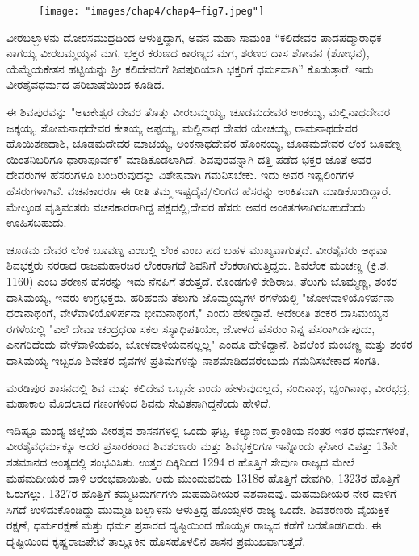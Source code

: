 \begin{figure}[!h]
\texttt{[image: "images/chap4/chap4–fig7.jpeg"]}
\end{figure}

ವೀರಬಲ್ಲಾಳನು ದೋರಸಮುದ್ರದಿಂದ ಆಳುತ್ತಿದ್ದಾಗ, ಅವನ ಮಹಾ ಸಾಮಂತ “ಕಲಿದೇವರ ಪಾದಪದ್ಮಾರಾಧಕ ನಾಗಯ್ಯ ವೀರಬಮ್ಮಯ್ಯನ ಮಗ, ಭಕ್ತರ ಕರುಣದ ಕಾರಣ್ಯದ ಮಗ, ಶರಣರ ದಾಸ ಶೋವನ (ಶೋಭನ), ಯೆಮ್ಮೆಯಕೇತನ ಹಟ್ಟಿಯನ್ನು ಶ‍್ರೀ ಕಲಿದೇವರಿಗೆ ಶಿವಪುರಿಯಾಗಿ ಭಕ್ತರಿಗೆ ಧರ್ಮವಾಗಿ” ಕೊಡುತ್ತಾರೆ. ಇದು ವೀರಶೈವಧರ್ಮದ ಪರಿಭಾಷೆಯಿಂದ ಕೂಡಿದೆ.

ಈ ಶಿವಪುರವನ್ನು "ಅಟಕೇಶ್ವರ ದೇವರ ತೊತ್ತು ವೀರಬಮ್ಮಯ್ಯ, ಚೂಡಮದೇವರ ಅಂಕಯ್ಯ, ಮಲ್ಲಿನಾಥದೇವರ ಜಕ್ಕಯ್ಯ, ಸೋಮನಾಥದೇವರ ಕೇತಯ್ಯ ಅಪ್ಪಯ್ಯ, ಮಲ್ಲಿನಾಥ ದೇವರ ಯೇಚಯ್ಯ, ರಾಮನಾಥದೇವರ ಹೊಯಿಶಣದಾಶಿ, ಚೂಡಮದೇವರ ಮಾಚಯ್ಯ, ಅಂಕನಾಥದೇವರ ಹೊಂನಯ್ಯ, ಚೂಡಮದೇವರ ಲೆಂಕ ಬೂವಣ್ನ ಯಿಂತನಿಬರಿಗೂ ಧಾರಾಪೂರ್ವಕ" ಮಾಡಿಕೊಡಲಾಗಿದೆ. ಶಿವಪುರವನ್ನಾಗಿ ದತ್ತಿ ಪಡೆದ ಭಕ್ತರ ಜೊತೆ ಅವರ ದೇವರುಗಳ ಹೆಸರುಗಳೂ ಬಂದಿರುವುದನ್ನು ವಿಶೇಷವಾಗಿ ಗಮನಿಸಬೇಕು. ಇದು ಅವರ ಇಷ್ಟಲಿಂಗಗಳ ಹೆಸರುಗಳಾಗಿವೆ. ವಚನಕಾರರೂ ಈ ರೀತಿ ತಮ್ಮ ಇಷ್ಟದೈವ/ಲಿಂಗದ ಹೆಸರನ್ನು ಅಂಕಿತವಾಗಿ ಮಾಡಿಕೊಂಡಿದ್ದಾರೆ. ಮೇಲ್ಕಂಡ ವೃತ್ತಿವಂತರು ವಚನಕಾರರಾಗಿದ್ದ ಪಕ್ಷದಲ್ಲಿ,ದೇವರ ಹೆಸರು ಅವರ ಅಂಕಿತಗಳಾಗಿರಬಹುದೆಂದು ಊಹಿಸಬಹುದು.

ಚೂಡಮ ದೇವರ ಲೆಂಕ ಬೂವಣ್ನ ಎಂಬಲ್ಲಿ ಲೆಂಕ ಎಂಬ ಪದ ಬಹಳ ಮುಖ್ಯವಾಗುತ್ತದೆ. ವೀರಶೈವರು ಅಥವಾ ಶಿವಭಕ್ತರು ನರರಾದ ರಾಜಮಹಾರಜರ ಲೆಂಕರಾಗದೆ ಶಿವನಿಗೆ ಲೆಂಕರಾಗಿರುತ್ತಿದ್ದರು. ಶಿವಲೆಂಕ ಮಂಚಣ್ಣ (ಕ್ರಿ.ಶ. 1160) ಎಂಬ ಶರಣನ ಹೆಸರನ್ನು ಇದು ನೆನಪಿಗೆ ತರುತ್ತದೆ. ಕೊಂಡಗುಳಿ ಕೇಶಿರಾಜ, ತೆಲುಗು ಜೊಮ್ಮಣ್ಣ, ಶಂಕರ ದಾಸಿಮಯ್ಯ, ಇವರು ಉಗ್ರಭಕ್ತರು. ಹರಿಹರನು ತೆಲುಗು ಜೊಮ್ಮಯ್ಯಗಳ ರಗಳೆಯಲ್ಲಿ "ಜೋಳವಾಳಿಯೊಳಿರ್ಪನಾ ಧರಾನಾಥಂಗೆ, ವೇಳೆವಾಳಿಯೊಳಿರ್ಪನಾ ಭೀಮನಾಥಂಗೆ," ಎಂದು ಹೇಳಿದ್ದಾನೆ. ಅದೇರೀತಿ ಶಂಕರ ದಾಸಿಮಯ್ಯನ ರಗಳೆಯಲ್ಲಿ "ಎಲೆ ದೇವಾ ಚಂದ್ರಧರಾ ಸಕಲ ಸಸ್ಯಾಧಿಪತಿಯೇ, ಜೋಳದ ಪೆಸರುಂ ನಿನ್ನ ಪೆಸರಾಗಿರ್ದಪುದು, ಎನಗರಿದೆಂದು ವೇಳೆವಾಳಿಯವಂ, ಜೋಳವಾಳಿಯವನಲ್ಲಲ್ಲ" ಎಂದೂ ಹೇಳಿದ್ದಾನೆ. ಶಿವಲೆಂಕ ಮಂಚಣ್ಣ ಮತ್ತು ಶಂಕರ ದಾಸಿಮಯ್ಯ ಇಬ್ಬರೂ ಶಿವೇತರ ದೈವಗಳ ಪ್ರತಿಮೆಗಳನ್ನು ನಾಶಮಾಡಿದವರೆಂಬುದು ಗಮನಿಸಬೇಕಾದ ಸಂಗತಿ.

ಮರಡಿಪುರ ಶಾಸನದಲ್ಲಿ ಶಿವ ಮತ್ತು ಕಲಿದೇವ ಒಬ್ಬನೇ ಎಂದು ಹೇಳುವುದಲ್ಲದೆ, ನಂದಿನಾಥ, ಭೃಂಗಿನಾಥ, ವೀರಭದ್ರ, ಮಹಾಕಾಲ ಮೊದಲಾದ ಗಣಂಗಳಿಂದ ಶಿವನು ಸೇವಿತನಾಗಿದ್ದನೆಂದು ಹೇಳಿದೆ.

ಇದಿಷ್ಟೂ ಮಂಡ್ಯ ಜಿಲ್ಲೆಯ ವೀರಶೈವ ಶಾಸನಗಳಲ್ಲಿ ಒಂದು ಘಟ್ಟ. ಕಲ್ಯಾಣದ ಕ್ರಾಂತಿಯ ನಂತರ ಇತರ ಧರ್ಮಗಳಂತೆ, ವೀರಶೈವಧರ್ಮಕ್ಕೂ ಅದರ ಪ್ರಸಾರಕರಾದ ಶಿವಶರಣರು ಮತ್ತು ಶಿವಭಕ್ತರಿಗೂ ಇನ್ನೊಂದು ಘೋರ ವಿಪತ್ತು 13ನೇ ಶತಮಾನದ ಅಂತ್ಯದಲ್ಲಿ ಸಂಭವಿಸಿತು. ಉತ್ತರ ದಿಕ್ಕಿನಿಂದ 1294 ರ ಹೊತ್ತಿಗೆ ಸೇವುಣ ರಾಜ್ಯದ ಮೇಲೆ ಮಹಮದೀಯರ ದಾಳಿ ಆರಂಭವಾಯಿತು. ಅದು ಮುಂದುವರಿದು 1318ರ ಹೊತ್ತಿಗೆ ದೇವಗಿರಿ, 1323ರ ಹೊತ್ತಿಗೆ ಓರುಗಲ್ಲು, 1327ರ ಹೊತ್ತಿಗೆ ಕಮ್ಮಟದುರ್ಗಗಳು ಮಹಮದೀಯರ ವಶವಾದವು. ಮಹಮದೀಯರ ನೇರ ದಾಳಿಗೆ ಸಿಗದೆ ಉಳಿದುಕೊಂಡಿದ್ದು ಮುಮ್ಮಡಿ ಬಲ್ಲಾಳನು ಆಳುತ್ತಿದ್ದ ಹೊಯ್ಸಳರ ರಾಜ್ಯ ಒಂದೇ. ಶಿವಶರಣರು ವೈಯಕ್ತಿಕ ರಕ್ಷಣೆ, ಧರ್ಮರಕ್ಷಣೆ ಮತ್ತು ಧರ್ಮ ಪ್ರಸಾರದ ದೃಷ್ಟಿಯಿಂದ ಹೊಯ್ಸಳ ರಾಜ್ಯದ ಕಡೆಗೆ ಬರತೊಡಗಿದರು. ಈ ದೃಷ್ಟಿಯಿಂದ ಕೃಷ್ಣರಾಜಪೇಟೆ ತಾಲ್ಲೂಕಿನ ಹೊಸಹೊಳಲಿನ ಶಾಸನ ಪ್ರಮುಖವಾಗುತ್ತದೆ.

